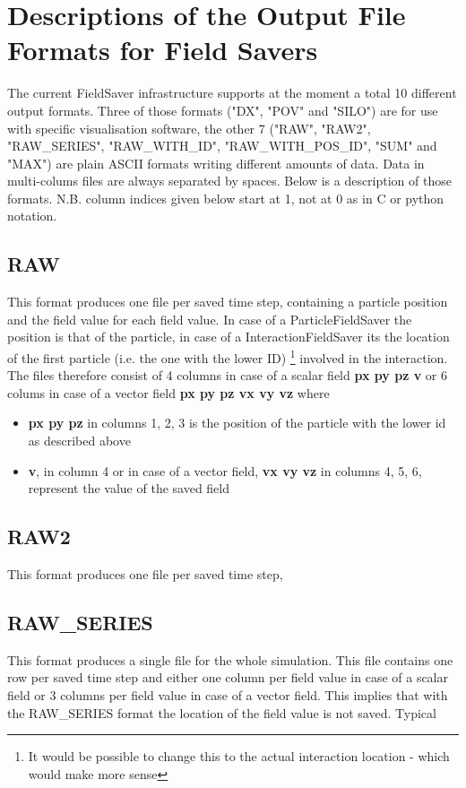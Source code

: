 \section{Descriptions of the Output File Formats for Field Savers}
\label{sec:file_format_description}

The current FieldSaver infrastructure supports at the moment a total 10 different output formats. Three of those formats ("DX", "POV" and "SILO") are for use with specific visualisation software, the other 7 ("RAW", "RAW2", "RAW\_SERIES", "RAW\_WITH\_ID", "RAW\_WITH\_POS\_ID", "SUM" and "MAX") are plain ASCII formats writing different amounts of data. Data in multi-colums files are always separated by spaces. Below is a description of those formats. N.B. column indices given below start at 1, not at 0 as in C or python notation.

\subsection{RAW}
This format produces one file per saved time step, containing a particle position and the field value for each field value. In case of a ParticleFieldSaver the position is that of the particle, in case of a InteractionFieldSaver its the location of the first particle (i.e. the one with the lower ID) \footnote{It would be possible to change this to the actual interaction location - which would make more sense} involved in the interaction. The files therefore consist of 4 columns in case of a scalar field \textbf{px py pz v} or 6 colums in case of a vector field \textbf{px py pz vx vy vz} where 
\begin{itemize}
\item \textbf{px py pz}  in columns 1, 2, 3 is the position of the particle with the lower id as described above
\item \textbf{v}, in column 4 or in case of a vector field, \textbf{vx vy vz} in columns 4, 5, 6, represent the value of the saved field 
\end{itemize}
  

\subsection{RAW2}
This format produces one file per saved time step, 

\subsection{RAW\_SERIES}
This format produces a single file for the whole simulation. This file contains one row per saved time step and either one column per field value in case of a scalar field or 3 columns per field value in case of a vector field. This implies that with the RAW\_SERIES format the location of the field value is not saved. Typical   

